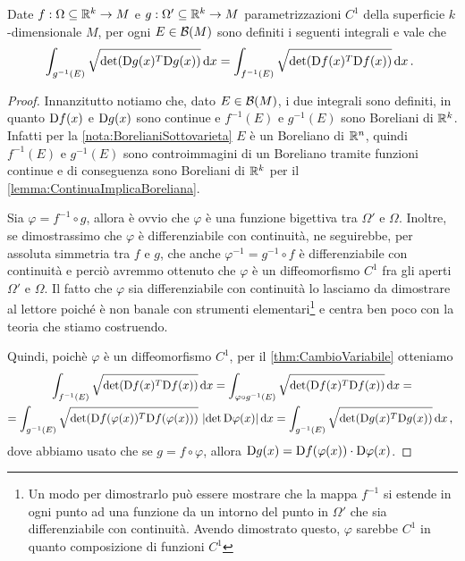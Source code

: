 \begin{lemma}\label{lemma:InvarianzaImmersione}
	Date $f:\Omega\subseteq\mathbb R^k\to M$ e $g:\Omega'\subseteq\mathbb R^k\to M$ parametrizzazioni $C^1$ della superficie $k$-dimensionale $M$, per ogni $E\in\mathcal B(M)$ sono definiti i seguenti integrali e vale che 
	\begin{equation*}
		\int_{g^{-1}(E)}\sqrt{\det(\mathrm D g(x)^T\mathrm D g(x))}\,\mathrm d x=\int_{f^{-1}(E)}\sqrt{\det(\mathrm D f(x)^T\mathrm D f(x))}\,\mathrm d x\, \text{. }
	\end{equation*}
\end{lemma}
\begin{proof}
	Innanzitutto notiamo che, dato $E\in\mathcal B(M)$, i due integrali sono definiti, in quanto $\mathrm D f(x)$ e $\mathrm D g(x)$ sono continue e $f^{-1}(E)$ e $g^{-1}(E)$ sono Boreliani di $\mathbb R^k$. Infatti per la \cref{nota:BorelianiSottovarieta} $E$ è un Boreliano di $\mathbb R^n$, quindi $f^{-1}(E)$ e $g^{-1}(E)$ sono controimmagini di un Boreliano tramite funzioni continue e di conseguenza sono Boreliani di $\mathbb R^k$ per il \cref{lemma:ContinuaImplicaBoreliana}.

	Sia $\varphi=f^{-1}\circ g$, allora è ovvio che $\varphi$ è una funzione bigettiva tra $\Omega'$ e $\Omega$. Inoltre, se dimostrassimo che $\varphi$ è differenziabile con continuità,  ne seguirebbe, per assoluta simmetria tra $f$ e $g$, che anche $\varphi^{-1}=g^{-1}\circ f$ è differenziabile con continuità e perciò avremmo ottenuto che $\varphi$ è un diffeomorfismo $C^1$ fra gli aperti $\Omega'$ e $\Omega$. Il fatto che $\varphi$ sia differenziabile con continuità lo lasciamo da dimostrare al lettore poiché è non banale con strumenti elementari\footnote{Un modo per dimostrarlo può essere mostrare che la mappa $f^{-1}$ si estende in ogni punto ad una funzione da un intorno del punto in $\Omega'$ che sia differenziabile con continuità. Avendo dimostrato questo, $\varphi$ sarebbe $C^1$ in quanto composizione di funzioni $C^1$} e centra ben poco con la teoria che stiamo costruendo.
	
	Quindi, poichè $\varphi$ è un diffeomorfismo $C^1$, per il \cref{thm:CambioVariabile} otteniamo
	\begin{multline*}
		\int_{f^{-1}(E)}\sqrt{\det(\mathrm D f(x)^T\mathrm D f(x))}\,\mathrm d x=\int_{\varphi\circ g^{-1}(E)}\sqrt{\det(\mathrm D f(x)^T\mathrm D f(x))}\,\mathrm d x=\\
		=\int_{g^{-1}(E)}\sqrt{\det(\mathrm D f(\varphi(x))^T\mathrm D f(\varphi(x)))}\ \lvert\det \mathrm D \varphi(x)\rvert\,\mathrm d x=\int_{g^{-1}(E)}\sqrt{\det(\mathrm D g(x)^T\mathrm D g(x))}\,\mathrm d x\, \text{, }
	\end{multline*}
	dove abbiamo usato che se $g=f\circ \varphi$, allora $\mathrm D g(x)=\mathrm D f(\varphi(x))\cdot \mathrm D\varphi(x)$.
\end{proof}

